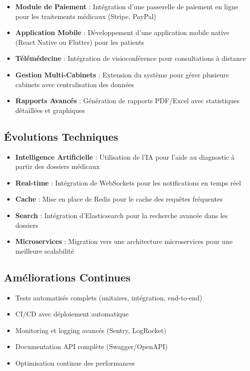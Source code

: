 \documentclass[12pt,a4paper]{report}
\begin{document}
\begin{itemize}
    \item \textbf{Module de Paiement} : Intégration d'une passerelle de paiement en ligne pour les traitements médicaux (Stripe, PayPal)
    \item \textbf{Application Mobile} : Développement d'une application mobile native (React Native ou Flutter) pour les patients
    \item \textbf{Télémédecine} : Intégration de visioconférence pour consultations à distance
    \item \textbf{Gestion Multi-Cabinets} : Extension du système pour gérer plusieurs cabinets avec centralisation des données
    \item \textbf{Rapports Avancés} : Génération de rapports PDF/Excel avec statistiques détaillées et graphiques
\end{itemize}

\subsection{Évolutions Techniques}

\begin{itemize}
    \item \textbf{Intelligence Artificielle} : Utilisation de l'IA pour l'aide au diagnostic à partir des dossiers médicaux
    \item \textbf{Real-time} : Intégration de WebSockets pour les notifications en temps réel
    \item \textbf{Cache} : Mise en place de Redis pour le cache des requêtes fréquentes
    \item \textbf{Search} : Intégration d'Elasticsearch pour la recherche avancée dans les dossiers
    \item \textbf{Microservices} : Migration vers une architecture microservices pour une meilleure scalabilité
\end{itemize}

\subsection{Améliorations Continues}

\begin{itemize}
    \item Tests automatisés complets (unitaires, intégration, end-to-end)
    \item CI/CD avec déploiement automatique
    \item Monitoring et logging avancés (Sentry, LogRocket)
    \item Documentation API complète (Swagger/OpenAPI)
    \item Optimisation continue des performances
\end{itemize}
\end{document}
